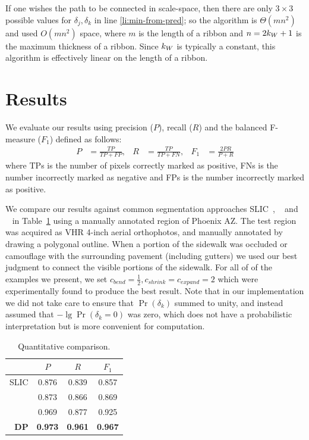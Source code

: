 If one wishes the path to be connected in scale-space, then there are only $3\times3$ possible values for $\delta_j, \delta_k$ in line \ref{li:min-from-pred}; so the algorithm is $\Theta(m n^2)$ and used $O(m n^2)$ space, where $m$ is the length of a ribbon and $n=2k_W+1$ is the maximum thickness of a ribbon. Since $k_W$ is typically a constant, this algorithm is effectively linear on the length of a ribbon. 



\section{Results}

We evaluate our results using precision ($P$), recall ($R$) and the balanced F-measure ($F_1$) defined as follows:
\begin{align}
     P &= \frac{\mathit{TP}}{\mathit{TP} + \mathit{FP}}, & 
     R &= \frac{\mathit{TP}}{\mathit{TP} + \mathit{FN}}, &    
     F_1 &= \frac{2 P R}{P + R}
\end{align}
where 
\acp{TP} is the number of pixels correctly marked as positive, 
\acp{FN} is the number incorrectly marked as negative and 
\acp{FP} is the number incorrectly marked as positive. 

We compare our results against common segmentation approaches 
\ac{SLIC}~\cite{Achanta2012-ah}, \ActiveContours{}~\cite{ActiveContou09} and \GrabCut{}~\cite{Rother2004-ou} 
in Table~\ref{tab:quantitative-against-common} using a manually annotated region of 
Phoenix AZ. The test region was acquired as \ac{VHR} 4-inch aerial orthophotos, 
and manually annotated by drawing a polygonal outline. 
When a portion of the sidewalk was occluded or camouflage with the surrounding pavement 
(including gutters) we used our best judgment to connect the visible portions of the sidewalk. For all of of the examples we present, we set $c_\mathit{bend}=\frac{1}{2}, c_\mathit{shrink}=c_\mathit{expand}=2$ which were experimentally found to produce the best result. Note that in our implementation we did not take care to ensure that $\Pr(\delta_k)$ summed to unity, and instead assumed that $-\lg \Pr(\delta_k=0)$ was zero, which does not have a probabilistic interpretation but is more convenient for computation. 

\begin{table}[h!]
    \caption{Quantitative comparison. }
    \label{tab:quantitative-against-common}
    \centering
    \begin{tabular}{r ccc}
                            & $P$ & $R$& $F_1$ \\ 
                                 \hline 
                  \ac{SLIC} & 0.876 & 0.839 & 0.857 \\
          \ActiveContours{} & 0.873 & 0.866 & 0.869  \\
                 \GrabCut{} & 0.969 & 0.877 & 0.925  \\ 
                                 \hline
                \textbf{DP} & \textbf{0.973} & \textbf{0.961} & \textbf{0.967}   
    \end{tabular}
\end{table}

